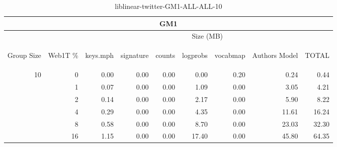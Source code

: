 \begin{center}
\begin{table}[htbp]
\begin{tabular}{ | r | r | r | r | r | r | r | r | r |}
\hline
\multicolumn{9}{|c|}{GM1}\\
\hline
 & & \multicolumn{7}{|c|}{Size (MB)}\\ \cline{3-9}
\begin{sideways}Group Size\end{sideways} & \begin{sideways}Web1T \% \end{sideways} & \begin{sideways}keys.mph\end{sideways} & \begin{sideways}signature\end{sideways} & \begin{sideways}counts\end{sideways} & \begin{sideways}logprobs\end{sideways} & \begin{sideways}vocabmap\end{sideways} & \begin{sideways}Authors Model \end{sideways} & \begin{sideways}TOTAL\end{sideways}\\
\hline
\multirow{5}{*}{10}
 & 0 & 0.00 & 0.00 & 0.00 & 0.00 & 0.20 & 0.24 & 0.44\\ \cline{2-9}
 & 1 & 0.07 & 0.00 & 0.00 & 1.09 & 0.00 & 3.05 & 4.21\\ \cline{2-9}
 & 2 & 0.14 & 0.00 & 0.00 & 2.17 & 0.00 & 5.90 & 8.22\\ \cline{2-9}
 & 4 & 0.29 & 0.00 & 0.00 & 4.35 & 0.00 & 11.61 & 16.24\\ \cline{2-9}
 & 8 & 0.58 & 0.00 & 0.00 & 8.70 & 0.00 & 23.03 & 32.30\\ \cline{2-9}
 & 16 & 1.15 & 0.00 & 0.00 & 17.40 & 0.00 & 45.80 & 64.35\\ \cline{2-9}
\hline
\end{tabular}
\caption{liblinear-twitter-GM1-ALL-ALL-10}
\label{table:liblinear-twitter-GM1-ALL-ALL-10}
\end{table}
\end{center}


